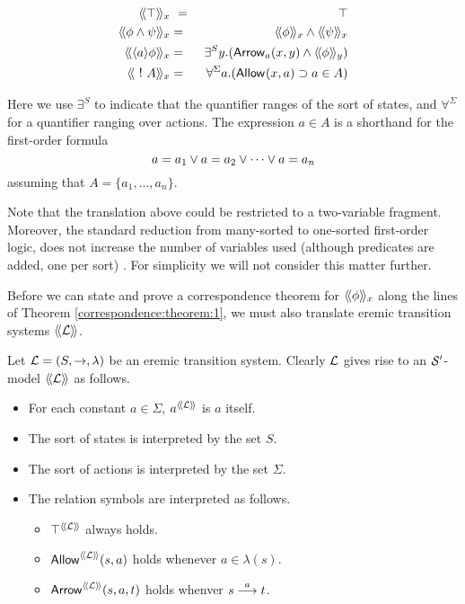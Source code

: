 \begin{eqnarray*}
  \SEMBTWO{\top}_x & \ = \ & \top
     \\
  \SEMBTWO{\phi \AND \psi}_x & = & \SEMBTWO{\phi}_x \AND \SEMBTWO{\psi}_x
     \\
  \SEMBTWO{\langle a \rangle \phi}_x & = & \exists^{S} y.(\ARROW{a}{x}{y} \AND \SEMBTWO{\phi}_y)
     \\
  \SEMBTWO{\fBang A}_x & = & \forall^{\Sigma} a.(\ALLOWED{}{x}{a} \IMPLIES a \in A) 
\end{eqnarray*}

\NI Here we use $\exists^{S}$ to indicate that the quantifier ranges
of the sort of states, and $\forall^{\Sigma}$ for a quantifier ranging
over actions. The expression $a \in A$ is a shorthand for the
first-order formula
\[
   a = a_1 \lor a = a_2 \lor \cdots \lor a = a_n
\]
assuming that $A = \{a_1, ..., a_n\}$.

Note that the translation above could be restricted to a two-variable
fragment. Moreover, the standard reduction from many-sorted to
one-sorted first-order logic, does not increase the number of
variables used (although predicates are added, one per sort)
\cite{EndertonHB:matinttl}. For simplicity we will not consider this
matter further.

Before we can state and prove a correspondence theorem for
$\langle\!\langle \phi \rangle\!\rangle_x$ along the lines of Theorem
\ref{correspondence:theorem:1}, we must also translate eremic
  transition systems $\langle\!\langle \mathcal{L} \rangle\!\rangle$.

\begin{definition}
Let $\mathcal{L} = (S, \rightarrow, \lambda)$ be an eremic transition
system. Clearly $\mathcal{L}$ gives rise to an $\mathcal{S}'$-model $\langle\!\langle \mathcal{L} \rangle\!\rangle$
as follows.
\begin{itemize}

\item For each constant $a \in \Sigma$, $a^{\langle\!\langle \mathcal{L} \rangle\!\rangle}$ is $a$ itself.

\item The sort of states is interpreted by the set $S$.

\item The sort of actions is interpreted by the set $\Sigma$.

\item The relation symbols are interpreted as follows.

  \begin{itemize}

    \item $\top^{\langle\!\langle \mathcal{L} \rangle\!\rangle}$ always holds.

    \item $\mathsf{Allow}^{\langle\!\langle \mathcal{L} \rangle\!\rangle}(s, a)$ holds whenever $a \in \lambda(s)$.

    \item $\mathsf{Arrow}^{\langle\!\langle \mathcal{L} \rangle\!\rangle}(s, a, t)$ holds whenver $s \stackrel{a}{\longrightarrow} t$.

  \end{itemize}
\end{itemize}
\end{definition}


